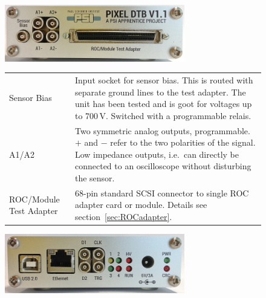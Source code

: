 \begin{figure}[hbtp]
    \begin{center}
	\includegraphics[width=0.7\textwidth]{img/DTB_front_full.jpg}

	\medskip

	\begin{tabular}{lp{10cm}}
	    Sensor Bias & Input socket for sensor bias. This is routed with separate ground lines to the test adapter. The unit has been tested and is goot for voltages up to 700\,V. Switched with a programmable relais. \\
	    A1/A2 & Two symmetric analog outputs, programmable. $+$ and $-$ refer to the two polarities of the signal. Low impedance outputs, i.e.~can directly be connected to an oscilloscope without disturbing the sensor. \\
	    ROC/Module Test Adapter & 68-pin standard SCSI connector to single ROC adapter card or module. Details see section~\ref{sec:ROCadapter}. \\
	\end{tabular}

	\bigskip

	\bigskip

	\includegraphics[width=0.7\textwidth]{img/DTB_back_full.jpg}

	\medskip


\end{center}
\end{figure}
